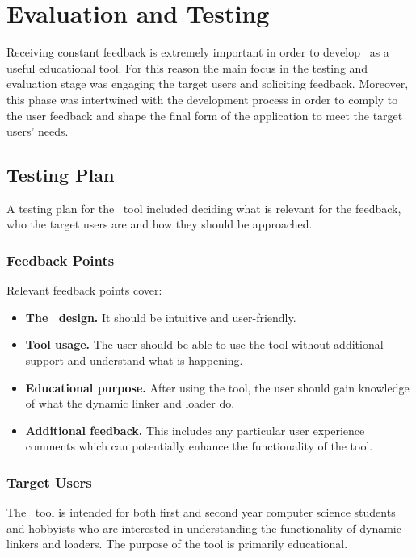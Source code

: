 \chapter{Evaluation and Testing}
\label{chapter:eval-test}

Receiving constant feedback is extremely important in order to develop \project\ as a useful educational tool. For this reason the main focus in the testing and evaluation stage was engaging the target users and soliciting feedback. Moreover, this phase was intertwined with the development process in order to comply to the user feedback and shape the final form of the application to meet the target users' needs.

\section{Testing Plan}
\label{sec:testing-plan}

A testing plan for the \project\ tool included deciding what is relevant for the feedback, who the target users are and how they should be approached.

\subsection{Feedback Points}
\label{sub-sec:feedback-points}

Relevant feedback points cover:
\begin{itemize}
\item \textbf{The \gui\ design.} It should be intuitive and user-friendly.
\item \textbf{Tool usage.} The user should be able to use the tool without additional support and understand what is happening.
\item \textbf{Educational purpose.} After using the tool, the user should gain knowledge of what the dynamic linker and loader do.
\item \textbf{Additional feedback.} This includes any particular user experience comments which can potentially enhance the functionality of the tool.
\end{itemize}

\subsection{Target Users}
\label{sub-sec:target-users}

The \project\ tool is intended for both first and second year computer science students and hobbyists who are interested in understanding the functionality of dynamic linkers and loaders. The purpose of the tool is primarily educational.

